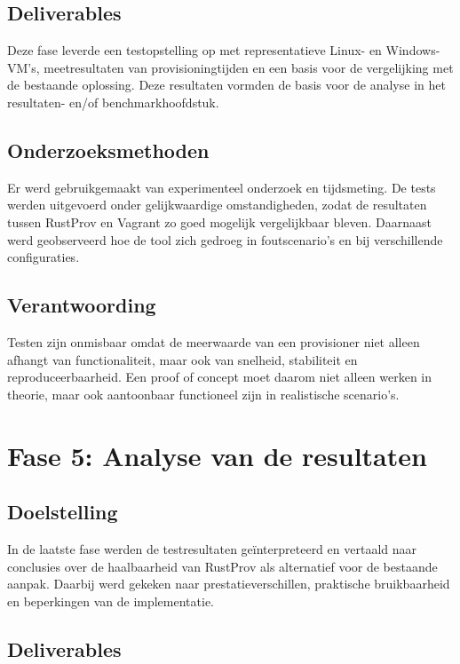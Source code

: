 \subsection{Deliverables}

Deze fase leverde een testopstelling op met representatieve Linux- en Windows-VM’s, meetresultaten van provisioningtijden en een basis voor de vergelijking met de bestaande oplossing. Deze resultaten vormden de basis voor de analyse in het resultaten- en/of benchmarkhoofdstuk. 

\subsection{Onderzoeksmethoden}

Er werd gebruikgemaakt van experimenteel onderzoek en tijdsmeting. De tests werden uitgevoerd onder gelijkwaardige omstandigheden, zodat de resultaten tussen RustProv en Vagrant zo goed mogelijk vergelijkbaar bleven. Daarnaast werd geobserveerd hoe de tool zich gedroeg in foutscenario’s en bij verschillende configuraties. 

\subsection{Verantwoording}

Testen zijn onmisbaar omdat de meerwaarde van een provisioner niet alleen afhangt van functionaliteit, maar ook van snelheid, stabiliteit en reproduceerbaarheid. Een proof of concept moet daarom niet alleen werken in theorie, maar ook aantoonbaar functioneel zijn in realistische scenario’s. 

\section{Fase 5: Analyse van de resultaten}

\subsection{Doelstelling}

In de laatste fase werden de testresultaten geïnterpreteerd en vertaald naar conclusies over de haalbaarheid van RustProv als alternatief voor de bestaande aanpak. Daarbij werd gekeken naar prestatieverschillen, praktische bruikbaarheid en beperkingen van de implementatie. 

\subsection{Deliverables}

